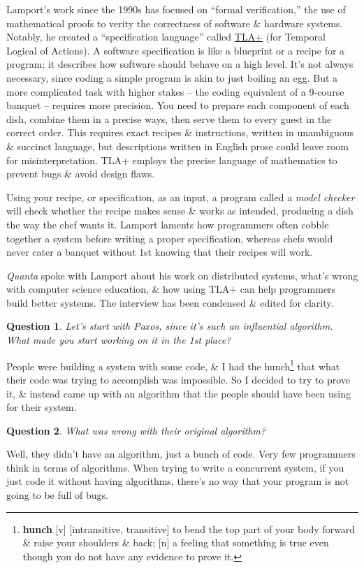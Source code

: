 \documentclass[oneside]{book}
\numberwithin{equation}{section}
\newtheorem{question}{Question}[chapter]
\begin{document}
Lamport's work since the 1990s has focused on ``formal verification,'' the use of mathematical proofs to verity the correctness of software \& hardware systems. Notably, he created a ``specification language'' called \href{https://lamport.azurewebsites.net/tla/tla.html}{TLA+} (for Temporal Logical of Actions). A software specification is like a blueprint or a recipe for a program; it describes how software should behave on a high level. It's not always necessary, since coding a simple program is akin to just boiling an egg. But a more complicated task with higher stakes -- the coding equivalent of a 9-course banquet -- requires more precision. You need to prepare each component of each dish, combine them in a precise ways, then serve them to every guest in the correct order. This requires exact recipes \& instructions, written in unambiguous \& succinct language, but descriptions written in English prose could leave room for misinterpretation. TLA+ employs the precise language of mathematics to prevent bugs \& avoid design flaws.

Using your recipe, or specification, as an input, a program called a \textit{model checker} will check whether the recipe makes sense \& works as intended, producing a dish the way the chef wants it. Lamport laments how programmers often cobble together a system before writing a proper specification, whereas chefs would never cater a banquet without 1st knowing that their recipes will work.

\textit{Quanta} spoke with Lamport about his work on distributed systems, what's wrong with computer science education, \& how using TLA+ can help programmers build better systems. The interview has been condensed \& edited for clarity.

\begin{question}
	Let's start with Paxos, since it's such an influential algorithm. What made you start working on it in the 1st place?
\end{question}
People were building a system with some code, \& I had the hunch\footnote{\textbf{hunch} [v] [intransitive, transitive] to bend the top part of your body forward \& raise your shoulders \& back; [n] a feeling that something is true even though you do not have any evidence to prove it.} that what their code was trying to accomplish was impossible. So I decided to try to prove it, \& instead came up with an algorithm that the people should have been using for their system.

\begin{question}
	What was wrong with their original algorithm?
\end{question} 
Well, they didn't have an algorithm, just a bunch of code. Very few programmers think in terms of algorithms. When trying to write a concurrent system, if you just code it without having algorithms, there's no way that your program is not going to be full of bugs.
\end{document}
